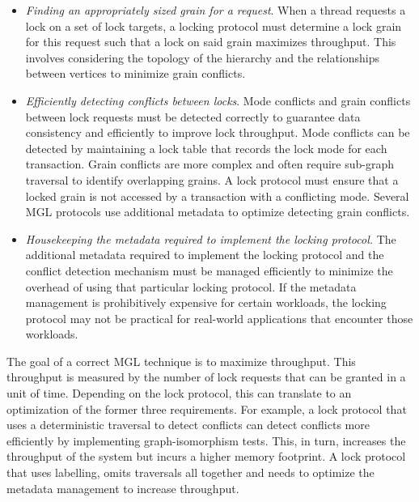 \begin{itemize}

    \item[\Rb] \emph{Finding an appropriately sized grain for a request}. When a thread requests a lock on a set of lock targets, a locking protocol must determine a lock grain for this request such that a lock on said grain maximizes throughput. This involves considering the topology of the hierarchy and the relationships between vertices to minimize grain conflicts.
    
    \item[\Rc] \emph{Efficiently detecting conflicts between locks}. Mode conflicts and grain conflicts between lock requests must be detected correctly to guarantee data consistency and efficiently to improve lock throughput. Mode conflicts can be detected by maintaining a lock table that records the lock mode for each transaction. Grain conflicts are more complex and often require sub-graph traversal to identify overlapping grains. A lock protocol must ensure that a locked grain is not accessed by a transaction with a conflicting mode. Several MGL protocols use additional metadata to optimize detecting grain conflicts.
    
    
    \item[\Rd] \emph{Housekeeping the metadata required to implement the locking protocol.} The additional metadata required to implement the locking protocol and the conflict detection mechanism must be managed efficiently to minimize the overhead of using that particular locking protocol. If the metadata management is prohibitively expensive for certain workloads, the locking protocol may not be practical for real-world applications that encounter those workloads. 

\end{itemize}


The goal of a correct MGL technique is to maximize throughput. This throughput is measured by the number of lock requests that can be granted in a unit of time. Depending on the lock protocol, this can translate to an optimization of the former three requirements. For example, a lock protocol that uses a deterministic traversal to detect conflicts can detect conflicts more efficiently by implementing graph-isomorphism tests. This, in turn, increases the throughput of the system but incurs a higher memory footprint. A lock protocol that uses labelling, omits traversals all together and needs to optimize the metadata management to increase throughput. 

